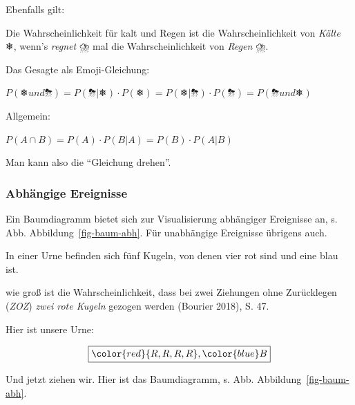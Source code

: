 \documentclass[
  a4paper,
  DIV=11]{scrreprt}
\theoremstyle{definition}
\theoremstyle{remark}
\begin{document}
Ebenfalls gilt:

Die Wahrscheinlichkeit für kalt und Regen ist die Wahrscheinlichkeit von
\emph{Kälte} ❄, wenn's \emph{regnet} ⛈️ mal die Wahrscheinlichkeit von
\emph{Regen} ⛈️.

Das Gesagte als Emoji-Gleichung:

\(P(❄️ und ⛈️) = P(⛈️ |❄️ ) \cdot P(❄️) = P(❄️ |⛈️ ) \cdot P(⛈️) = P(⛈️ und ❄️)\)

Allgemein:

\(P(A\cap B) = P(A) \cdot P(B|A) = P(B) \cdot P(A|B)\)

Man kann also die ``Gleichung drehen''.

\hypertarget{abhuxe4ngige-ereignisse}{%
\subsubsection{Abhängige Ereignisse}\label{abhuxe4ngige-ereignisse}}

Ein Baumdiagramm bietet sich zur Visualisierung abhängiger Ereignisse
an, s. Abb. Abbildung~\ref{fig-baum-abh}. Für unabhängige Ereignisse
übrigens auch.

In einer Urne befinden sich fünf Kugeln, von denen vier rot sind und
eine blau ist.

wie groß ist die Wahrscheinlichkeit, dass bei zwei Ziehungen ohne
Zurücklegen (\emph{ZOZ}) \emph{zwei rote Kugeln} gezogen werden (Bourier
2018), S. 47.

Hier ist unsere Urne:

\[\boxed{\color{red}{R, R, R, R}, \color{blue}B}\]

Und jetzt ziehen wir. Hier ist das Baumdiagramm, s. Abb.
Abbildung~\ref{fig-baum-abh}.
\end{document}
